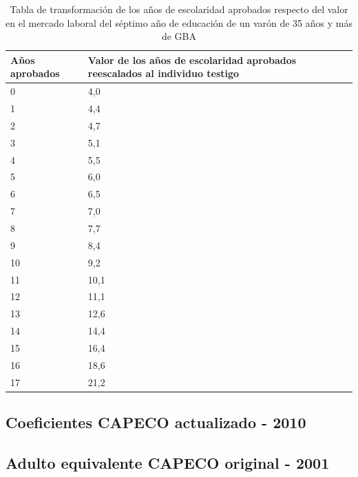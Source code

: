 \begin{table}[h!]
	\small
	\centering
	\caption{Tabla de transformación de los años de escolaridad aprobados respecto del valor en el mercado laboral del séptimo año de educación de un varón de 35 años y más de GBA}
	\label{tab:tableVAE2001}
	\begin{tabular}{p{1cm}|p{3cm}}
		Años aprobados & Valor de los años de escolaridad aprobados
		reescalados al individuo testigo \\
		\hline
		0 & 4,0\\
		\hline
		1 & 4,4\\
		\hline
		2 & 4,7\\
		\hline
		3 & 5,1\\
		\hline
		4 & 5,5\\
		\hline
		5 & 6,0\\
		\hline
		6 & 6,5\\
		\hline
		7 & 7,0\\
		\hline
		8 & 7,7\\
		\hline
		9 & 8,4\\
		\hline
		10 & 9,2\\
		\hline
		11 & 10,1\\
		\hline
		12 & 11,1\\
		\hline
		13 & 12,6\\
		\hline
		14 & 14,4\\
		\hline
		15 & 16,4\\
		\hline
		16 & 18,6\\
		\hline
		17 & 21,2\\
		
	\end{tabular}
\end{table}

\subsection{Coeficientes CAPECO actualizado - 2010}

\subsection{Adulto equivalente CAPECO original - 2001}\label{anexo}